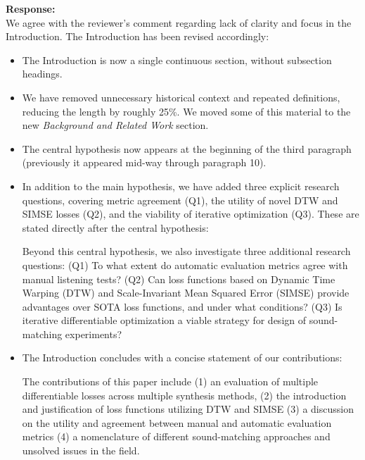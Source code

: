 \documentclass[11pt]{article}
\begin{document}
\noindent\textbf{Response:} \\
We agree with the reviewer’s comment regarding lack of clarity and focus in the Introduction. The Introduction has been revised accordingly: 
\begin{itemize}
  \item The Introduction is now a single continuous section, without subsection headings.  
  \item We have removed unnecessary historical context and repeated definitions, reducing the length by roughly 25\%. We moved some of this material to the new \emph{Background and Related Work} section.  
  \item The central hypothesis now appears at the beginning of the third paragraph (previously it appeared mid-way through paragraph 10).  
  \item In addition to the main hypothesis, we have added three explicit research questions, covering metric agreement (Q1), the utility of novel DTW and SIMSE losses (Q2), and the viability of iterative optimization (Q3).  These are stated directly after the central hypothesis:

  \begin{displayquote}
     Beyond this central hypothesis, we also investigate three additional research questions: (Q1) To what extent do automatic evaluation metrics agree with manual listening tests? (Q2) Can loss functions based on Dynamic Time Warping (DTW) and Scale-Invariant Mean Squared Error (SIMSE) provide advantages over SOTA loss functions, and under what conditions?
    (Q3) Is iterative differentiable optimization a viable strategy for design of sound-matching experiments?
\end{displayquote}

  \item The Introduction concludes with a concise statement of our contributions:

  \begin{displayquote}
      The contributions of this paper include (1) an evaluation of multiple differentiable losses across multiple synthesis methods, (2) the introduction and justification of loss functions utilizing DTW and SIMSE (3) a discussion on the utility and agreement between manual and automatic evaluation metrics (4) a nomenclature of different sound-matching approaches and unsolved issues in the field. 
  \end{displayquote}
\end{itemize}
\end{document}
